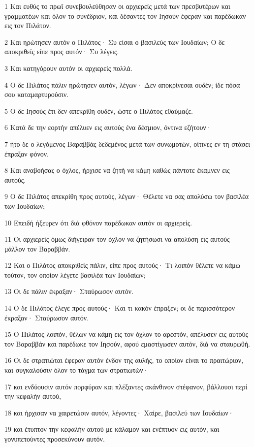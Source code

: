 \par 1 Και ευθύς το πρωΐ συνεβουλεύθησαν οι αρχιερείς μετά των πρεσβυτέρων και γραμματέων και όλον το συνέδριον, και δέσαντες τον Ιησούν έφεραν και παρέδωκαν εις τον Πιλάτον.
\par 2 Και ηρώτησεν αυτόν ο Πιλάτος· Συ είσαι ο βασιλεύς των Ιουδαίων; Ο δε αποκριθείς είπε προς αυτόν· Συ λέγεις.
\par 3 Και κατηγόρουν αυτόν οι αρχιερείς πολλά.
\par 4 Ο δε Πιλάτος πάλιν ηρώτησεν αυτόν, λέγων· Δεν αποκρίνεσαι ουδέν; ίδε πόσα σου καταμαρτυρούσιν.
\par 5 Ο δε Ιησούς έτι δεν απεκρίθη ουδέν, ώστε ο Πιλάτος εθαύμαζε.
\par 6 Κατά δε την εορτήν απέλυεν εις αυτούς ένα δέσμιον, όντινα εζήτουν·
\par 7 ήτο δε ο λεγόμενος Βαραββάς δεδεμένος μετά των συνωμοτών, οίτινες εν τη στάσει έπραξαν φόνον.
\par 8 Και αναβοήσας ο όχλος, ήρχισε να ζητή να κάμη καθώς πάντοτε έκαμνεν εις αυτούς.
\par 9 Ο δε Πιλάτος απεκρίθη προς αυτούς, λέγων· Θέλετε να σας απολύσω τον βασιλέα των Ιουδαίων;
\par 10 Επειδή ήξευρεν ότι διά φθόνον παρέδωκαν αυτόν οι αρχιερείς.
\par 11 Οι αρχιερείς όμως διήγειραν τον όχλον να ζητήσωσι να απολύση εις αυτούς μάλλον τον Βαραββάν.
\par 12 Και ο Πιλάτος αποκριθείς πάλιν, είπε προς αυτούς· Τι λοιπόν θέλετε να κάμω τούτον, τον οποίον λέγετε βασιλέα των Ιουδαίων;
\par 13 Οι δε πάλιν έκραξαν· Σταύρωσον αυτόν.
\par 14 Ο δε Πιλάτος έλεγε προς αυτούς· Και τι κακόν έπραξεν; οι δε περισσότερον έκραξαν· Σταύρωσον αυτόν.
\par 15 Ο Πιλάτος λοιπόν, θέλων να κάμη εις τον όχλον το αρεστόν, απέλυσεν εις αυτούς τον Βαραββάν και παρέδωκε τον Ιησούν, αφού εμαστίγωσεν αυτόν, διά να σταυρωθή.
\par 16 Οι δε στρατιώται έφεραν αυτόν ένδον της αυλής, το οποίον είναι το πραιτώριον, και συγκαλούσιν όλον το τάγμα των στρατιωτών·
\par 17 και ενδύουσιν αυτόν πορφύραν και πλέξαντες ακάνθινον στέφανον, βάλλουσι περί την κεφαλήν αυτού,
\par 18 και ήρχισαν να χαιρετώσιν αυτόν, λέγοντες· Χαίρε, βασιλεύ των Ιουδαίων·
\par 19 και έτυπτον την κεφαλήν αυτού με κάλαμον και ενέπτυον εις αυτόν, και γονυπετούντες προσεκύνουν αυτόν.
